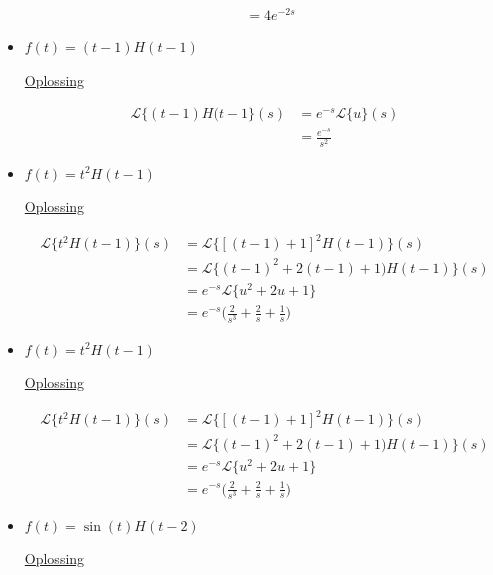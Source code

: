 \documentclass[12pt]{report}
\newcommand{\exercise}[2]{
#1


\underline{Oplossing}

#2

\hrulefill
}
\begin{document}
\begin{itemize}[label={}]
{{\begin{equation*}
\begin{split}
                                             & = 4e^{-2s}
         \end{split}
        \end{equation*}
    }
 }
 \item{
    \exercise{
        $f(t) = (t - 1)H(t - 1)$
    }{
        \begin{equation*}
         \begin{split}
          \mathcal{L}\{(t - 1)H(t - 1\}(s) & = e^{-s}\mathcal{L}\{u\}(s) \\
                                           & = \frac{e^{-s}}{s^2}
         \end{split}
        \end{equation*}
    }
 }
 \item{
    \exercise{
        $f(t) = t^2H(t-1)$
    }{
        \begin{equation*}
         \begin{split}
          \mathcal{L}\{t^2H(t-1)\}(s) & = \mathcal{L}\{[(t-1)+1]^2H(t-1)\}(s) \\
                                      & = \mathcal{L}\{(t-1)^2 + 2(t-1)+1)H(t-1)\}(s) \\
                                      & = e^{-s}\mathcal{L}\{u^2 + 2u + 1\} \\
                                      & = e^{-s}\bigg(\frac{2}{s^3} + \frac{2}{s} + \frac{1}{s}\bigg)
         \end{split}
        \end{equation*}
    }
 }
 \item{
    \exercise{
        $f(t) = t^2H(t-1)$
    }{
        \begin{equation*}
         \begin{split}
          \mathcal{L}\{t^2H(t-1)\}(s) & = \mathcal{L}\{[(t-1)+1]^2H(t-1)\}(s) \\
                                      & = \mathcal{L}\{(t-1)^2 + 2(t-1)+1)H(t-1)\}(s) \\
                                      & = e^{-s}\mathcal{L}\{u^2 + 2u + 1\} \\
                                      & = e^{-s}\bigg(\frac{2}{s^3} + \frac{2}{s} + \frac{1}{s}\bigg)
         \end{split}
        \end{equation*}
    }
 }
 \item{
    \exercise{
        $f(t) = \sin(t)H(t-2)$
    }{
        \begin{equation*}
         \begin{split}

\end{split}
\end{equation*}}}
\end{itemize}
\end{document}
